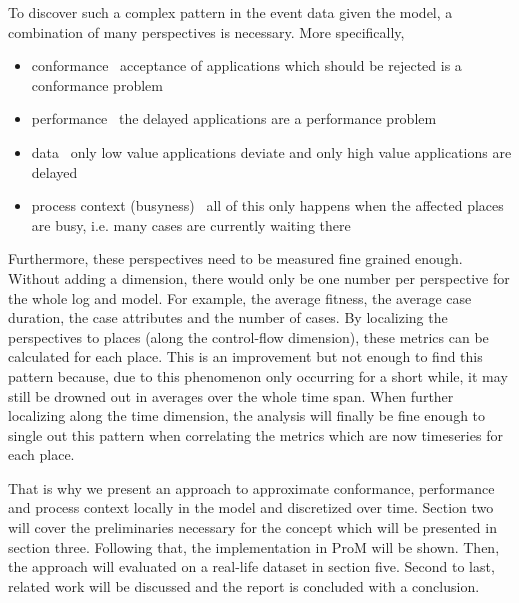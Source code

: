 To discover such a complex pattern in the event data given the model, a combination of many perspectives is necessary. More specifically,
\begin{itemize}
    \item conformance \textemdash \ acceptance of applications which should be rejected is a conformance problem
    \item performance \textemdash \ the delayed applications are a performance problem
    \item data \textemdash \ only low value applications deviate and only high value applications are delayed
    \item process context (busyness) \textemdash \ all of this only happens when the affected places are busy, i.e. many cases are currently waiting there
\end{itemize}
Furthermore, these perspectives need to be measured fine grained enough. Without adding a dimension, there would only be one number per perspective for the whole log and model. For example, the average fitness, the average case duration, the case attributes and the number of cases. By localizing the perspectives to places (along the control-flow dimension), these metrics can be calculated for each place. This is an improvement but not enough to find this pattern because, due to this phenomenon only occurring for a short while, it may still be drowned out in averages over the whole time span. When further localizing along the time dimension, the analysis will finally be fine enough to single out this pattern when correlating the metrics which are now timeseries for each place.

That is why we present an approach to approximate conformance, performance and process context locally in the model and discretized over time. Section two will cover the preliminaries necessary for the concept which will be presented in section three. Following that, the implementation in ProM will be shown. Then, the approach will evaluated on a real-life dataset in section five. Second to last, related work will be discussed and the report is concluded with a conclusion.